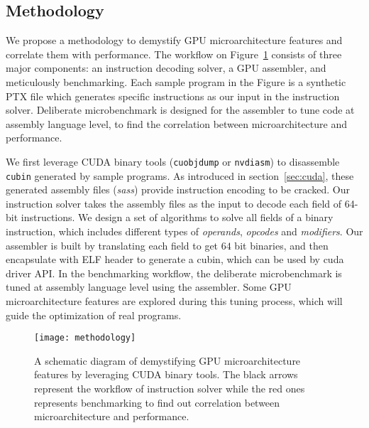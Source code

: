 \subsection{Methodology}

We propose a methodology to demystify GPU microarchitecture features and correlate them with performance.
The workflow on Figure~\ref{fig:workflow} consists of three major components: an instruction decoding solver, a GPU assembler, and meticulously
benchmarking. %
Each sample program in the Figure is a synthetic PTX file which generates specific instructions as our input in the instruction solver.%
Deliberate microbenchmark is designed for the assembler to tune code at assembly language level, to find the correlation
between microarchitecture and performance.

We first leverage CUDA binary tools ({\tt cuobjdump} or {\tt nvdiasm}) to disassemble {\tt cubin} generated by sample programs. %
As introduced in section~\ref{sec:cuda}, these generated assembly files ({\em sass}) provide instruction encoding to be cracked.
Our instruction solver takes the assembly files as the input to decode each field of 64-bit instructions.
We design a set of algorithms to solve all fields of a binary instruction, which includes different types of {\em operands}, {\em opcodes} and {\em modifiers}.
Our assembler is built by translating each field to get $64$ bit binaries, and then encapsulate with ELF header to
generate a cubin, which can be used by cuda driver API.
In the benchmarking workflow, the deliberate microbenchmark is tuned at assembly language level using the assembler.
Some GPU microarchitecture features are explored during this tuning process, which will guide the optimization of real programs.


\begin{figure}[htbp]
\begin{center}
\texttt{[image: methodology]}
\caption{A schematic diagram of demystifying GPU microarchitecture features by leveraging CUDA binary tools. The black arrows
represent the workflow of instruction solver while the red ones represents benchmarking to find out correlation between microarchitecture
    and performance.}%
\label{fig:workflow}
\end{center}
\end{figure}
